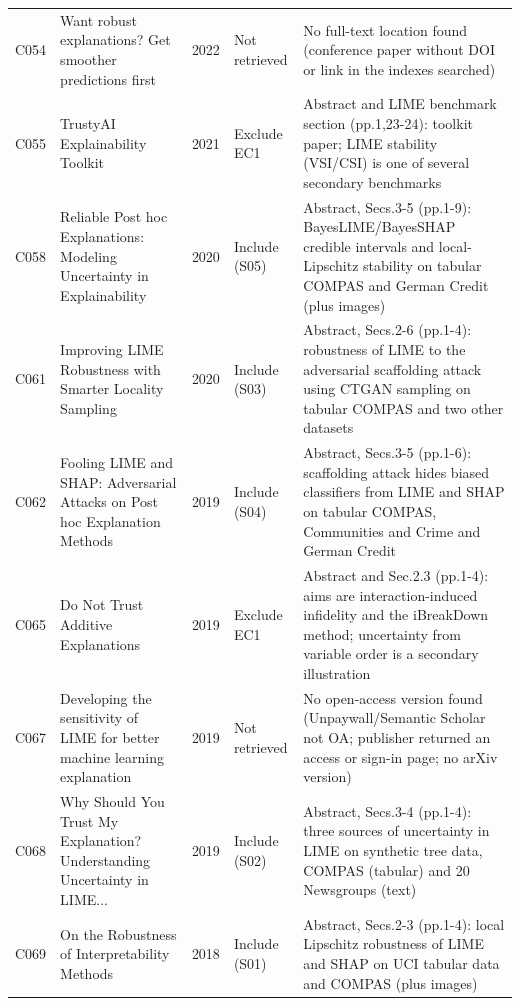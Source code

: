 \begin{longtable}{@{}P{1.0cm}P{6.3cm}P{0.7cm}P{1.6cm}P{6.1cm}@{}}
C054 & Want robust explanations? Get smoother predictions first & 2022 & Not retrieved & No full-text location found (conference paper without DOI or link in the indexes searched) \\
C055 & TrustyAI Explainability Toolkit & 2021 & Exclude EC1 & Abstract and LIME benchmark section (pp.1,23-24): toolkit paper; LIME stability (VSI/\allowbreak{}CSI) is one of several secondary benchmarks \\
C058 & Reliable Post hoc Explanations: Modeling Uncertainty in Explainability & 2020 & Include (S05) & Abstract, Secs.3-5 (pp.1-9): BayesLIME/\allowbreak{}BayesSHAP credible intervals and local-Lipschitz stability on tabular COMPAS and German Credit (plus images) \\
C061 & Improving LIME Robustness with Smarter Locality Sampling & 2020 & Include (S03) & Abstract, Secs.2-6 (pp.1-4): robustness of LIME to the adversarial scaffolding attack using CTGAN sampling on tabular COMPAS and two other datasets \\
C062 & Fooling LIME and SHAP: Adversarial Attacks on Post hoc Explanation Methods & 2019 & Include (S04) & Abstract, Secs.3-5 (pp.1-6): scaffolding attack hides biased classifiers from LIME and SHAP on tabular COMPAS, Communities and Crime and German Credit \\
C065 & Do Not Trust Additive Explanations & 2019 & Exclude EC1 & Abstract and Sec.2.3 (pp.1-4): aims are interaction-induced infidelity and the iBreakDown method; uncertainty from variable order is a secondary illustration \\
C067 & Developing the sensitivity of LIME for better machine learning explanation & 2019 & Not retrieved & No open-access version found (Unpaywall/\allowbreak{}Semantic Scholar not OA; publisher returned an access or sign-in page; no arXiv version) \\
C068 & \textquotedbl{}Why Should You Trust My Explanation?\textquotedbl{} Understanding Uncertainty in LIME... & 2019 & Include (S02) & Abstract, Secs.3-4 (pp.1-4): three sources of uncertainty in LIME on synthetic tree data, COMPAS (tabular) and 20 Newsgroups (text) \\
C069 & On the Robustness of Interpretability Methods & 2018 & Include (S01) & Abstract, Secs.2-3 (pp.1-4): local Lipschitz robustness of LIME and SHAP on UCI tabular data and COMPAS (plus images) \\
\end{longtable}
